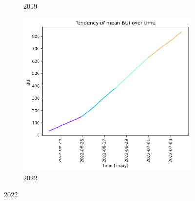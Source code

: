 \begin{figure}[h]
\begin{subfigure}{0.3\textwidth}
        \caption{2019}
        \label{fig:bui_prior_15_days_2019}
    \end{subfigure}
    \hfill
    \begin{subfigure}{0.3\textwidth}
        \centering
        \includegraphics[width=\textwidth]{graphs/2022/tendency/2022_tendency_graph_BUI.png}
        \caption{2022}
        \label{fig:bui_prior_15_days_2022}
    \end{subfigure}
    
    \label{fig:bui_values_15days_prior}
\end{figure}